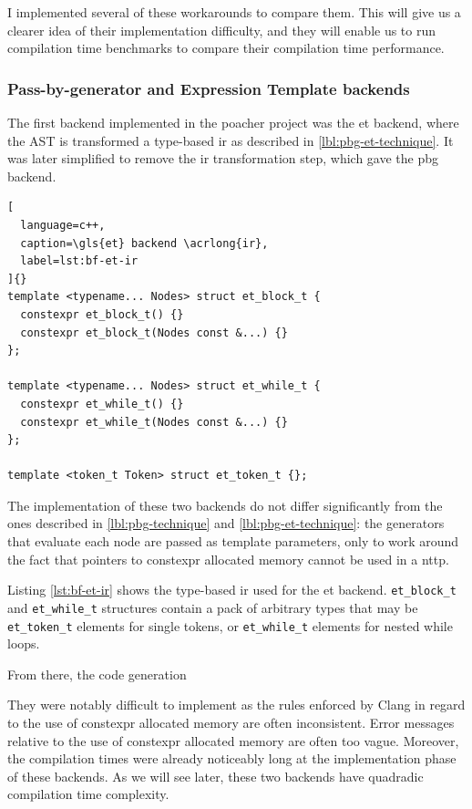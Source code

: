 \documentclass[../main]{subfiles}
\begin{document}
I implemented several of these workarounds to compare them.
This will give us a clearer idea of their implementation difficulty,
and they will enable us to run compilation time benchmarks to compare their
compilation time performance.

\subsubsection{Pass-by-generator and Expression Template backends}

The first backend implemented in the poacher project was the \gls{et} backend,
where the AST is transformed a type-based \gls{ir}
as described in \ref{lbl:pbg-et-technique}. It was later simplified to
remove the \gls{ir} transformation step, which gave the \gls{pbg} backend.

\begin{lstlisting}[
  language=c++,
  caption=\gls{et} backend \acrlong{ir},
  label=lst:bf-et-ir
]{}
template <typename... Nodes> struct et_block_t {
  constexpr et_block_t() {}
  constexpr et_block_t(Nodes const &...) {}
};

template <typename... Nodes> struct et_while_t {
  constexpr et_while_t() {}
  constexpr et_while_t(Nodes const &...) {}
};

template <token_t Token> struct et_token_t {};
\end{lstlisting}

The implementation of these two backends do not differ significantly from
the ones described in \ref{lbl:pbg-technique} and \ref{lbl:pbg-et-technique}:
the generators that evaluate each node are passed as template parameters,
only to work around the fact that pointers to \gls{constexpr} allocated memory
cannot be used in a \gls{nttp}.

Listing \ref{lst:bf-et-ir} shows the type-based \gls{ir} used for the \gls{et}
backend. \lstinline{et_block_t} and \lstinline{et_while_t} structures contain a
pack of arbitrary types that may be \lstinline{et_token_t} elements for single
tokens, or \lstinline{et_while_t} elements for nested while loops.

From there, the code generation

They were notably difficult to implement as the rules enforced by Clang
in regard to the use of \gls{constexpr} allocated memory are often inconsistent.
Error messages relative to the use of \gls{constexpr} allocated memory are often
too vague. Moreover, the compilation times were already noticeably long
at the implementation phase of these backends. As we will see later,
these two backends have quadradic compilation time complexity.
\end{document}
